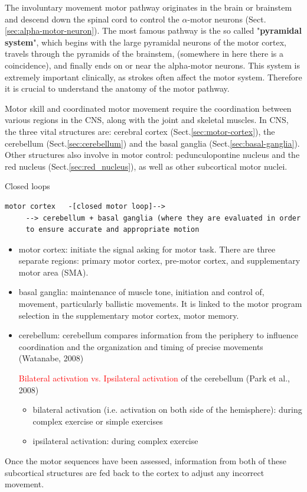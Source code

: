 The involuntary movement motor pathway originates in the brain or brainstem and
descend down the spinal cord to control the $\alpha$-motor neurons
(Sect.\ref{sec:alpha-motor-neuron}). The most famous pathway is the so called
"{\bf pyramidal system}", which begins with the large pyramidal neurons of the
motor cortex, travels through the pyramids of the brainstem, (somewhere in here
there is a coincidence), and finally ends on or near the alpha-motor neurons.
This system is extremely important clinically, as strokes often affect the motor
system. Therefore it is crucial to understand the anatomy of the motor pathway.


Motor skill and coordinated motor movement require the coordination between
various regions in the CNS, along with the joint and skeletal muscles.
In CNS, the three vital structures are: cerebral cortex
(Sect.\ref{sec:motor-cortex}), the cerebellum (Sect.\ref{sec:cerebellum}) and
the basal ganglia (Sect.\ref{sec:basal-ganglia}). Other structures also involve
in motor control: pedunculopontine nucleus and the red nucleus
(Sect.\ref{sec:red_nucleus}), as well as other subcortical motor nuclei.

Closed loops
\begin{verbatim}
motor cortex   -[closed motor loop]--> 
     --> cerebellum + basal ganglia (where they are evaluated in order 
     to ensure accurate and appropriate motion
\end{verbatim}

\begin{itemize}
  \item motor cortex: initiate the signal asking for motor task. There are three
  separate regions: primary motor cortex, pre-motor cortex, and supplementary
  motor area (SMA).
  
  \item basal ganglia: maintenance of muscle tone, initiation
and control of, movement, particularly ballistic movements. It is linked to the
motor program selection in the supplementary motor cortex, motor memory.

  \item cerebellum: cerebellum
compares information from the periphery to influence coordination and the
organization and timing of precise movements (Watanabe, 
2008)

\textcolor{red}{Bilateral activation vs. Ipsilateral activation} of the
cerebellum (Park et al., 2008)
\begin{itemize}
  \item bilateral activation (i.e. activation on both side of the hemisphere):
  during complex exercise or simple exercises
  
  \item ipsilateral activation: during complex exercise 
\end{itemize}

\end{itemize}
Once the motor sequences have been assessed, information from both of these
subcortical structures are fed back to the cortex to adjust any incorrect
movement.

